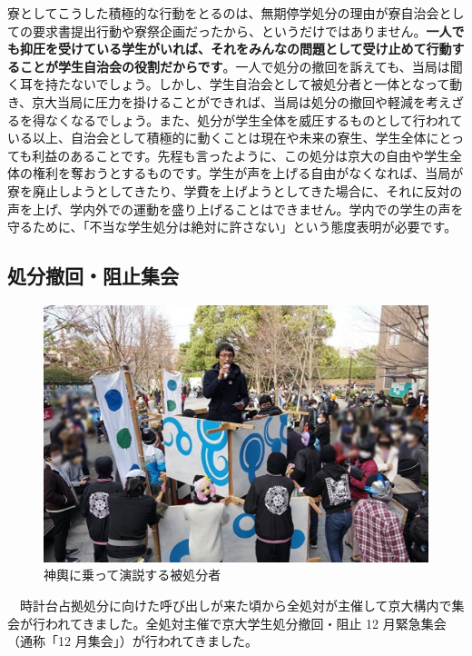 寮としてこうした積極的な行動をとるのは、無期停学処分の理由が寮自治会としての要求書提出行動や寮祭企画だったから、というだけではありません。\textbf{一人でも抑圧を受けている学生がいれば、それをみんなの問題として受け止めて行動することが学生自治会の役割だからです}。一人で処分の撤回を訴えても、当局は聞く耳を持たないでしょう。しかし、学生自治会として被処分者と一体となって動き、京大当局に圧力を掛けることができれば、当局は処分の撤回や軽減を考えざるを得なくなるでしょう。また、処分が学生全体を威圧するものとして行われている以上、自治会として積極的に動くことは現在や未来の寮生、学生全体にとっても利益のあることです。先程も言ったように、この処分は京大の自由や学生全体の権利を奪おうとするものです。学生が声を上げる自由がなくなれば、当局が寮を廃止しようとしてきたり、学費を上げようとしてきた場合に、それに反対の声を上げ、学内外での運動を盛り上げることはできません。学内での学生の声を守るために、「不当な学生処分は絶対に許さない」という態度表明が必要です。


\subsection{処分撤回・阻止集会}

\begin{figure}
    \vspace*{-\intextsep}
    \includegraphics[width=18zw]{gazo/202112shukai.pdf}
    \captionsetup{labelformat=empty,labelsep=none}
    \caption{神輿に乗って演説する被処分者}
\end{figure}

　時計台占拠処分に向けた呼び出しが来た頃から全処対が主催して京大構内で集会が行われてきました。全処対主催で京大学生処分撤回・阻止 12 月緊急集会（通称「12 月集会」）が行われてきました。

